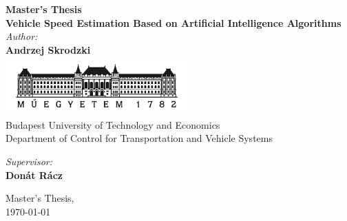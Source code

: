 \documentclass[12pt, a4paper, titlepage, onehalfspacing]{report}
\date{\today}
\begin{document}
\begin{titlepage}
\begin{center}

{ \LARGE \textbf{Master's Thesis}\\[2.5cm]}
{ \LARGE \textbf{Vehicle Speed Estimation Based on Artificial Intelligence Algorithms}\\ [2.5cm]}
{\normalsize \emph{Author:}}\\
{ \large \bfseries Andrzej Skrodzki}\\[4cm]

\includegraphics[width=70mm]{images/BMElogo.png}\\[0.5cm]
{\normalsize Budapest University of Technology and Economics\\ Department of Control for Transportation and Vehicle Systems\\[2.5cm]}

\begin{minipage}{0.7\textwidth}
\centering
{\normalsize \emph{Supervisor:} \\
 \bfseries Donát Rácz}\\
\end{minipage}

\vfill
{\normalsize  Master's Thesis, \\\large \today}\\[0.5cm]

\end{center}
\end{titlepage}   
\newpage
{}


\tableofcontents




\end{document}

